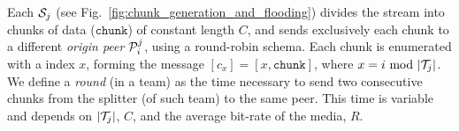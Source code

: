 \begin{figure*}
  \caption{Chunk generation and
    flooding.\label{fig:chunk_generation_and_flooding}}
\end{figure*}
Each ${\cal S}_j$ (see Fig.~\ref{fig:chunk_generation_and_flooding})
divides the stream into chunks of data ($\mathtt{chunk}$) of constant
length $C$, and sends exclusively each chunk to a different
\emph{origin peer} ${\cal P}^j_i$, using a round-robin schema. Each
chunk is enumerated with a index $x$, forming the message
$[c_x]=[x,\mathtt{chunk}]$, where $x=i~\mathrm{mod}~|{\cal T}_j|$. We
define a \emph{round} (in a team) as the time necessary to send two
consecutive chunks from the splitter (of such team) to the same
peer. This time is variable and depends on $|{\cal T}_j|$, $C$, and
the average bit-rate of the media, $R$.

\begin{comment}
The round-time is defined by:
\begin{equation}
  \cal{r} = \cal{c}N.
  \label{eq:round_time}
\end{equation}
For example, if we use only one team of $N=256$ peers, a chunk size
$C=1024$~bytes, and a video of $1$~Mb/s, the round time is
\begin{displaymath}
  \cal{r} = \frac{1024\frac{\text{bytes}}{\text{chunk}}\times
    8\frac{\text{bits}}{\text{byte}}}{10^6\frac{\text{bits}}{\text{second}}}\times
  256 \approx 2.1~\text{seconds}.
\end{displaymath}
\end{comment}
